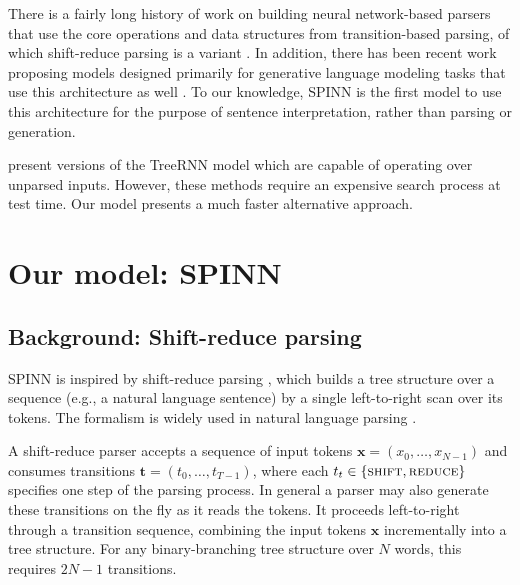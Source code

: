 \documentclass[11pt]{article}
\newcommand{\shift}{\textsc{shift}}
\newcommand{\reduce}{\textsc{reduce}}
\begin{document}
There is a fairly long history of work on building neural network-based parsers that use the core operations and data structures from transition-based parsing, of which shift-reduce parsing is a variant \citep{henderson2004discriminative,emami2005neural,titov2010latent,chen2014,buys2generative,dyer-EtAl:2015:ACL-IJCNLP,kiperwasser2016easy}. In addition, there has been recent work proposing models designed primarily for generative language modeling tasks that use this architecture as well \citep{zhang2016top,dyer2016rnn}. To our knowledge, SPINN is the first model to use this architecture for the purpose of sentence interpretation, rather than parsing or generation.  %

\citet{socher2011parsing,socher2011semi} present versions of the TreeRNN model which are capable of operating over unparsed inputs. However, these methods require an expensive search process at test time. Our model presents a much faster alternative approach.

\section{Our model: SPINN}

\subsection{Background: Shift-reduce parsing}

SPINN is inspired by shift-reduce parsing \citep{aho1972theory}, which builds a tree structure over a sequence (e.g., a natural language sentence) by a single left-to-right scan over its tokens. The formalism is widely used in natural language parsing \citep[e.g.,][]{shieber:1983:ACL,nivre2003efficient}.

A shift-reduce parser accepts a sequence of input tokens $\mathbf x = (x_0, \dots, x_{N-1})$ and consumes transitions $\mathbf t = (t_0, \dots, t_{T-1})$, where each $t_t \in \{\shift, \reduce\}$ specifies one step of the parsing process. In general a parser may also generate these transitions on the fly as it reads the tokens. It proceeds left-to-right through a transition sequence, combining the input tokens $\mathbf x$ incrementally into a tree structure. For any binary-branching tree structure over $N$ words, this requires $2N - 1$ transitions.
\end{document}
